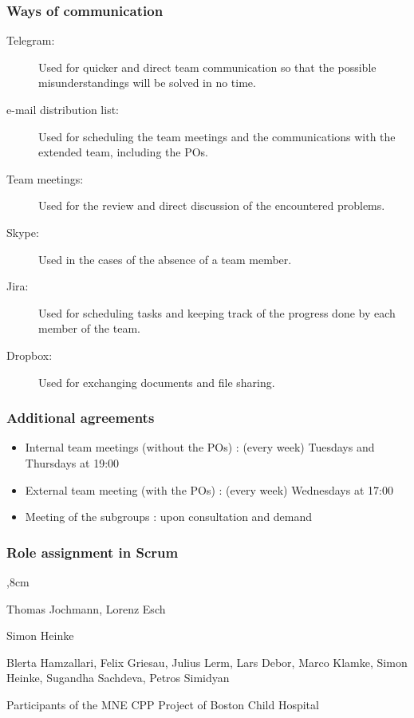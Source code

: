 \subsubsection{Ways of communication}
\begin{description}
	\item[Telegram:] Used for quicker and direct team communication so that the possible misunderstandings will be solved in no time.
	
	\item[e-mail distribution list:] Used for scheduling the team meetings and the communications with the extended team, including the POs. 
	
	\item[Team meetings:] Used for the review and direct discussion of the encountered problems. 
	
	\item[Skype:] Used in the cases of the absence of a team member. 
	
	\item [Jira:] Used for scheduling tasks and keeping track of the progress done by each member of the team.
	
	\item[Dropbox:] Used for exchanging documents and file sharing.  
\end{description}

\subsubsection{Additional agreements}
\begin{itemize}
	\item Internal team meetings (without the POs) : (every week) Tuesdays and Thursdays at 19:00
	
	\item External team meeting (with the POs) : (every week) Wednesdays at 17:00
	
	\item Meeting of the subgroups : upon consultation and demand 
\end{itemize}

\subsubsection{Role assignment in Scrum}

\begin{description}
	,8cm
	\item[Produkt Owner:] Thomas Jochmann, Lorenz Esch
	
	\item[Scrum Master:] Simon Heinke
	
	\item[Development team:] Blerta Hamzallari, Felix Griesau, Julius Lerm, Lars Debor, Marco Klamke, Simon Heinke, Sugandha Sachdeva, Petros Simidyan
	
	\item[Client, User:] Participants of the MNE CPP Project of Boston Child Hospital
	
\end{description}

